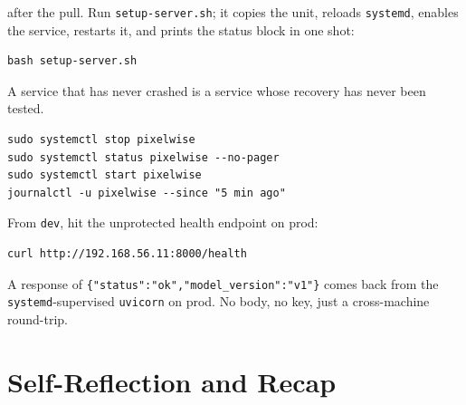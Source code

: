  after the pull. Run
\texttt{setup-server.sh}; it copies the unit, reloads \texttt{systemd},
enables the service, restarts it, and prints the status block in one
shot:

\begin{verbatim}
bash setup-server.sh
\end{verbatim}


A service that has never crashed is a service whose recovery has never been
tested.

\begin{verbatim}
sudo systemctl stop pixelwise
sudo systemctl status pixelwise --no-pager
sudo systemctl start pixelwise
journalctl -u pixelwise --since "5 min ago"
\end{verbatim}

From \texttt{dev}, hit the unprotected health endpoint on prod:

\begin{verbatim}
curl http://192.168.56.11:8000/health
\end{verbatim}

A response of \texttt{\{"status":"ok","model\_version":"v1"\}} comes
back from the \texttt{systemd}-supervised \texttt{uvicorn} on prod. No
body, no key, just a cross-machine round-trip.





\newpage
\section{Self-Reflection and Recap}

